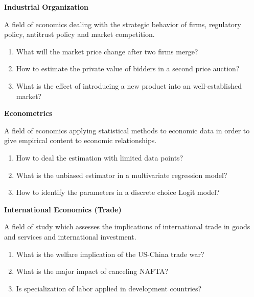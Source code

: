 \documentclass{beamer}
\let\olditem=\item%
\renewcommand{\item}{\olditem \justifying}%
\begin{document}
\begin{frame}{\bf Industrial Organization}
\begin{definition}
A field of economics dealing with the strategic behavior of firms, regulatory policy, antitrust policy and market competition.
\end{definition}
\begin{enumerate}
	\item What will the market price change after two firms merge?
	\item How to estimate the private value of bidders in a second price auction?
	\item What is the effect of introducing a new product into an well-established market?
\end{enumerate}
\end{frame}

\begin{frame}{\bf Econometrics}
\begin{definition}
	A field of economics applying statistical methods to economic data in order to give empirical content to economic relationships. 
\end{definition}
\begin{enumerate}
		\item How to deal the estimation with limited data points?
	\item What is the unbiased estimator in a multivariate regression model?
	\item How to identify the parameters in a discrete choice Logit model?
\end{enumerate}
\end{frame}


\begin{frame}{\bf International Economics (Trade)}
\begin{definition}
A field of study which assesses the implications of international trade in goods and services and international investment. 
\end{definition}
\begin{enumerate}
	\item What is the welfare implication of the US-China trade war?
	\item What is the major impact of canceling NAFTA?
	\item Is specialization of labor applied in development countries?
\end{enumerate}
\end{frame}
\end{document}
